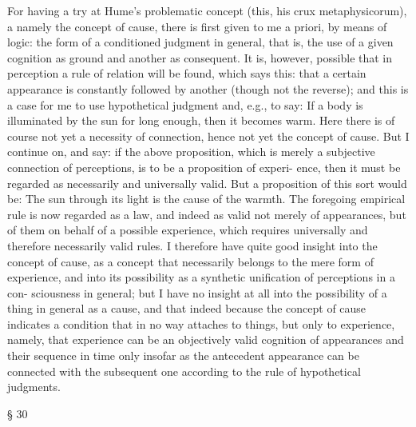 For having a try at Hume’s problematic concept (this, his crux
metaphysicorum), a namely the concept of cause, there is ﬁrst given to
me a priori, by means of logic: the form of a conditioned judgment in
general, that is, the use of a given cognition as ground and another as
consequent. It is, however, possible that in perception a rule of relation
will be found, which says this: that a certain appearance is constantly
followed by another (though not the reverse); and this is a case for me to
use hypothetical judgment and, e.g., to say: If a body is illuminated by
the sun for long enough, then it becomes warm. Here there is of course
not yet a necessity of connection, hence not yet the concept of cause.
But I continue on, and say: if the above proposition, which is merely a
subjective connection of perceptions, is to be a proposition of experi-
ence, then it must be regarded as necessarily and universally valid. But a
proposition of this sort would be: The sun through its light is the cause
of the warmth. The foregoing empirical rule is now regarded as a law,
and indeed as valid not merely of appearances, but of them on behalf of a
possible experience, which requires universally and therefore necessarily
valid rules. I therefore have quite good insight into the concept of cause,
as a concept that necessarily belongs to the mere form of experience,
and into its possibility as a synthetic uniﬁcation of perceptions in a con-
sciousness in general; but I have no insight at all into the possibility of
a thing in general as a cause, and that indeed because the concept of
cause indicates a condition that in no way attaches to things, but only to
experience, namely, that experience can be an objectively valid cognition
of appearances and their sequence in time only insofar as the antecedent
appearance can be connected with the subsequent one according to the
rule of hypothetical judgments.

§ 30

